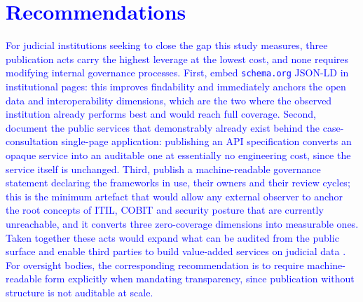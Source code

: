 \documentclass[engproc,proceedingpaper,submit,moreauthors]{Definitions/mdpi}
\begin{document}
\section{\textcolor{blue}{Recommendations}}
\label{sec:recommendations}

    \textcolor{blue}{For judicial institutions seeking to close the gap this study measures, three publication acts carry the highest leverage at the lowest cost, and none requires modifying internal governance processes. First, embed \texttt{schema.org} JSON-LD in institutional pages: this improves findability \cite{Guha2016} and immediately anchors the open data and interoperability dimensions, which are the two where the observed institution already performs best and would reach full coverage. Second, document the public services that demonstrably already exist behind the case-consultation single-page application: publishing an API specification converts an opaque service into an auditable one at essentially no engineering cost, since the service itself is unchanged. Third, publish a machine-readable governance statement declaring the frameworks in use, their owners and their review cycles; this is the minimum artefact that would allow any external observer to anchor the root concepts of ITIL, COBIT and security posture that are currently unreachable, and it converts three zero-coverage dimensions into measurable ones. Taken together these acts would expand what can be audited from the public surface and enable third parties to build value-added services on judicial data \cite{Attard2015,Wilkinson2016}. For oversight bodies, the corresponding recommendation is to require machine-readable form explicitly when mandating transparency, since publication without structure is not auditable at scale.}
\end{document}
